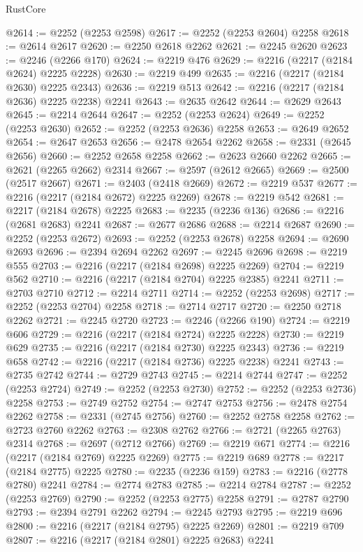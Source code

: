 \begin{lexlean}{RustCore}
\begin{coremodule}
@2614 := @2252 (@2253 @2598)
@2617 := @2252 (@2253 @2604) @2258
@2618 := @2614 @2617
@2620 := @2250 @2618 @2262
@2621 := @2245 @2620
@2623 := @2246 (@2266 @170)
@2624 := @2219 @476
@2629 := @2216 (@2217 (@2184 @2624) @2225 @2228)
@2630 := @2219 @499
@2635 := @2216 (@2217 (@2184 @2630) @2225 @2343)
@2636 := @2219 @513
@2642 := @2216 (@2217 (@2184 @2636) @2225 @2238) @2241
@2643 := @2635 @2642
@2644 := @2629 @2643
@2645 := @2214 @2644
@2647 := @2252 (@2253 @2624)
@2649 := @2252 (@2253 @2630)
@2652 := @2252 (@2253 @2636) @2258
@2653 := @2649 @2652
@2654 := @2647 @2653
@2656 := @2478 @2654 @2262
@2658 := @2331 (@2645 @2656)
@2660 := @2252 @2658 @2258
@2662 := @2623 @2660 @2262
@2665 := @2621 (@2265 @2662) @2314
@2667 := @2597 (@2612 @2665)
@2669 := @2500 (@2517 @2667)
@2671 := @2403 (@2418 @2669)
@2672 := @2219 @537
@2677 := @2216 (@2217 (@2184 @2672) @2225 @2269)
@2678 := @2219 @542
@2681 := @2217 (@2184 @2678) @2225
@2683 := @2235 (@2236 @136)
@2686 := @2216 (@2681 @2683) @2241
@2687 := @2677 @2686
@2688 := @2214 @2687
@2690 := @2252 (@2253 @2672)
@2693 := @2252 (@2253 @2678) @2258
@2694 := @2690 @2693
@2696 := @2394 @2694 @2262
@2697 := @2245 @2696
@2698 := @2219 @555
@2703 := @2216 (@2217 (@2184 @2698) @2225 @2269)
@2704 := @2219 @562
@2710 := @2216 (@2217 (@2184 @2704) @2225 @2385) @2241
@2711 := @2703 @2710
@2712 := @2214 @2711
@2714 := @2252 (@2253 @2698)
@2717 := @2252 (@2253 @2704) @2258
@2718 := @2714 @2717
@2720 := @2250 @2718 @2262
@2721 := @2245 @2720
@2723 := @2246 (@2266 @190)
@2724 := @2219 @606
@2729 := @2216 (@2217 (@2184 @2724) @2225 @2228)
@2730 := @2219 @629
@2735 := @2216 (@2217 (@2184 @2730) @2225 @2343)
@2736 := @2219 @658
@2742 := @2216 (@2217 (@2184 @2736) @2225 @2238) @2241
@2743 := @2735 @2742
@2744 := @2729 @2743
@2745 := @2214 @2744
@2747 := @2252 (@2253 @2724)
@2749 := @2252 (@2253 @2730)
@2752 := @2252 (@2253 @2736) @2258
@2753 := @2749 @2752
@2754 := @2747 @2753
@2756 := @2478 @2754 @2262
@2758 := @2331 (@2745 @2756)
@2760 := @2252 @2758 @2258
@2762 := @2723 @2760 @2262
@2763 := @2308 @2762
@2766 := @2721 (@2265 @2763) @2314
@2768 := @2697 (@2712 @2766)
@2769 := @2219 @671
@2774 := @2216 (@2217 (@2184 @2769) @2225 @2269)
@2775 := @2219 @689
@2778 := @2217 (@2184 @2775) @2225
@2780 := @2235 (@2236 @159)
@2783 := @2216 (@2778 @2780) @2241
@2784 := @2774 @2783
@2785 := @2214 @2784
@2787 := @2252 (@2253 @2769)
@2790 := @2252 (@2253 @2775) @2258
@2791 := @2787 @2790
@2793 := @2394 @2791 @2262
@2794 := @2245 @2793
@2795 := @2219 @696
@2800 := @2216 (@2217 (@2184 @2795) @2225 @2269)
@2801 := @2219 @709
@2807 := @2216 (@2217 (@2184 @2801) @2225 @2683) @2241

\end{coremodule}
\end{lexlean}
